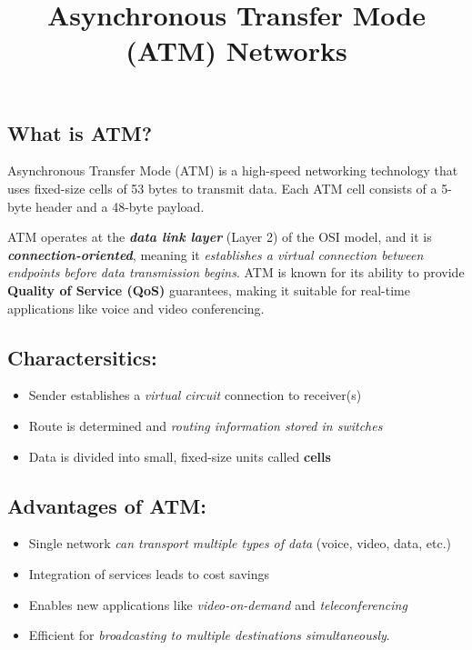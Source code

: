 \documentclass[
]{article}
\title{Asynchronous Transfer Mode (ATM) Networks}
\author{}
\date{}
\providecommand{\tightlist}{%
  \setlength{\itemsep}{0pt}\setlength{\parskip}{0pt}}
\begin{document}
\maketitle

\hypertarget{what-is-atm}{%
\subsection{What is ATM?}\label{what-is-atm}}

Asynchronous Transfer Mode (ATM) is a high-speed networking technology
that uses fixed-size cells of 53 bytes to transmit data. Each ATM cell
consists of a 5-byte header and a 48-byte payload.

ATM operates at the \textbf{\emph{data link layer}} (Layer 2) of the OSI
model, and it is \textbf{\emph{connection-oriented}}, meaning it
\emph{establishes a virtual connection between endpoints before data
transmission begins}. ATM is known for its ability to provide
\textbf{Quality of Service (QoS)} guarantees, making it suitable for
real-time applications like voice and video conferencing.

\hypertarget{charactersitics}{%
\subsection{Charactersitics:}\label{charactersitics}}

\begin{itemize}
\tightlist
\item
  Sender establishes a \emph{virtual circuit} connection to receiver(s)
\item
  Route is determined and \emph{routing information stored in switches}
\item
  Data is divided into small, fixed-size units called \textbf{cells}
\end{itemize}

\hypertarget{advantages-of-atm}{%
\subsection{Advantages of ATM:}\label{advantages-of-atm}}

\begin{itemize}
\tightlist
\item
  Single network \emph{can transport multiple types of data} (voice,
  video, data, etc.)
\item
  Integration of services leads to cost savings
\item
  Enables new applications like \emph{video-on-demand} and
  \emph{teleconferencing}
\item
  Efficient for \emph{broadcasting to multiple destinations
  simultaneously}.
\end{itemize}
\end{document}
